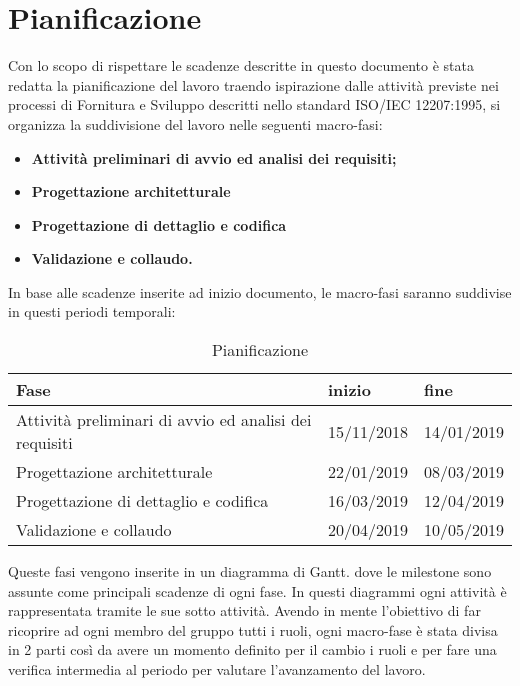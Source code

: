 \section{Pianificazione}

Con lo scopo di rispettare le scadenze descritte in questo documento è stata redatta la pianificazione del lavoro traendo ispirazione dalle attività previste nei processi di Fornitura e Sviluppo descritti nello standard ISO/IEC 12207:1995, si organizza la suddivisione del lavoro nelle seguenti macro-fasi:
\begin{itemize}
	\item{\textbf{Attività preliminari di avvio ed analisi dei requisiti;}}
	\item{\textbf{Progettazione architetturale}}
	\item{\textbf{Progettazione di dettaglio e codifica}}
	\item{\textbf{Validazione e collaudo.}}
\end{itemize} 
In base alle scadenze inserite ad inizio documento, le macro-fasi saranno suddivise in questi periodi temporali:
\newline
\begin{table}[h!]
	\centering
	\renewcommand{\arraystretch}{2} 
	\begin{tabular}{|l|l|l|}
		\hline
		\rowcolor{orange!50}
		\textbf{Fase} & \textbf{inizio} & \textbf{fine}\\
		\hline
		Attività preliminari di avvio ed analisi dei requisiti & 15/11/2018 & 14/01/2019 \\
		\hline
		Progettazione architetturale & 22/01/2019 & 08/03/2019\\
		\hline
		Progettazione di dettaglio e codifica & 16/03/2019 & 12/04/2019\\
		\hline
		Validazione e collaudo & 20/04/2019 & 10/05/2019\\
		\hline
	\end{tabular}
	\caption{Pianificazione}
\end{table}

Queste fasi vengono inserite in un diagramma di Gantt. dove le milestone sono assunte come principali scadenze di ogni fase. In questi diagrammi ogni attività è rappresentata tramite le sue sotto attività.
\newline Avendo in mente l'obiettivo di far ricoprire ad ogni membro del gruppo tutti i ruoli, ogni macro-fase è stata divisa in 2 parti così da avere un momento definito per il cambio i ruoli e per fare una verifica intermedia al periodo per valutare l'avanzamento del lavoro. 


\newpage~

\newpage~

\newpage~

\newpage ~\newpage ~
